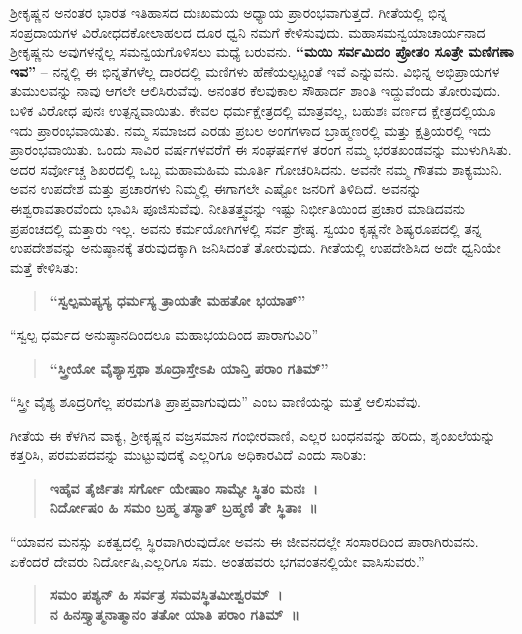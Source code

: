 ಶ‍್ರೀಕೃಷ್ಣನ ಅನಂತರ ಭಾರತ ಇತಿಹಾಸದ ದುಃಖಮಯ ಅಧ್ಯಾಯ ಪ್ರಾರಂಭವಾಗುತ್ತದೆ. ಗೀತೆಯಲ್ಲಿ ಭಿನ್ನ ಸಂಪ್ರದಾಯಗಳ ವಿರೋಧದ\break ಕೋಲಾಹಲದ ದೂರ ಧ್ವನಿ ನಮಗೆ ಕೇಳಿಸುವುದು. ಮಹಾಸಮನ್ವಯಾಚಾರ್ಯನಾದ ಶ‍್ರೀಕೃಷ್ಣನು ಅವುಗಳನ್ನೆಲ್ಲ ಸಮನ್ವಯಗೊಳಿಸಲು ಮಧ್ಯೆ ಬರುವನು. \textbf{“ಮಯಿ ಸರ್ವಮಿದಂ ಪ್ರೋತಂ ಸೂತ್ರೇ ಮಣಿಗಣಾ ಇವ”} – ನನ್ನಲ್ಲಿ ಈ ಭಿನ್ನತೆಗಳೆಲ್ಲ ದಾರದಲ್ಲಿ ಮಣಿಗಳು ಹೆಣೆಯಲ್ಪಟ್ಟಂತೆ ಇವೆ ಎನ್ನುವನು. ವಿಭಿನ್ನ ಅಭಿಪ್ರಾಯಗಳ ತುಮುಲವನ್ನು ನಾವು ಆಗಲೇ ಆಲಿಸಿರುವೆವು. ಅನಂತರ ಕೆಲವುಕಾಲ ಸೌಹಾರ್ದ ಶಾಂತಿ ಇದ್ದುವೆಂದು ತೋರುವುದು. ಬಳಿಕ ವಿರೋಧ ಪುನಃ ಉತ್ಪನ್ನವಾಯಿತು. ಕೇವಲ ಧರ್ಮಕ್ಷೇತ್ರದಲ್ಲಿ ಮಾತ್ರವಲ್ಲ, ಬಹುಶಃ ವರ್ಣದ ಕ್ಷೇತ್ರದಲ್ಲಿಯೂ ಇದು ಪ್ರಾರಂಭವಾಯಿತು. ನಮ್ಮ ಸಮಾಜದ ಎರಡು ಪ್ರಬಲ ಅಂಗಗಳಾದ ಬ್ರಾಹ್ಮಣರಲ್ಲಿ ಮತ್ತು ಕ್ಷತ್ರಿಯರಲ್ಲಿ ಇದು ಪ್ರಾರಂಭವಾಯಿತು. ಒಂದು ಸಾವಿರ ವರ್ಷಗಳವರೆಗೆ ಈ ಸಂಘರ್ಷಗಳ ತರಂಗ ನಮ್ಮ ಭರತಖಂಡವನ್ನು ಮುಳುಗಿಸಿತು. ಅದರ ಸರ್ವೋಚ್ಚ ಶಿಖರದಲ್ಲಿ ಒಬ್ಬ ಮಹಾಮಹಿಮ ಮೂರ್ತಿ ಗೋಚರಿಸಿದನು. ಅವನೇ ನಮ್ಮ ಗೌತಮ ಶಾಕ್ಯಮುನಿ. ಅವನ ಉಪದೇಶ ಮತ್ತು ಪ್ರಚಾರಗಳು ನಿಮ್ಮಲ್ಲಿ ಈಗಾಗಲೇ ಎಷ್ಟೋ ಜನರಿಗೆ ತಿಳಿದಿದೆ. ಅವನನ್ನು ಈಶ್ವರಾವತಾರವೆಂದು ಭಾವಿಸಿ ಪೂಜಿಸುವೆವು. ನೀತಿತತ್ತ್ವವನ್ನು ಇಷ್ಟು ನಿರ್ಭೀತಿಯಿಂದ ಪ್ರಚಾರ ಮಾಡಿದವನು ಪ್ರಪಂಚದಲ್ಲಿ ಮತ್ತಾರು ಇಲ್ಲ. ಅವನು ಕರ್ಮಯೋಗಿಗಳಲ್ಲಿ ಸರ್ವ ಶ್ರೇಷ್ಠ. ಸ್ವಯಂ ಕೃಷ್ಣನೇ ಶಿಷ್ಯರೂಪದಲ್ಲಿ ತನ್ನ ಉಪದೇಶವನ್ನು ಅನುಷ್ಠಾನಕ್ಕೆ ತರುವುದಕ್ಕಾಗಿ ಜನಿಸಿದಂತೆ ತೋರುವುದು. ಗೀತೆಯಲ್ಲಿ ಉಪದೇಶಿಸಿದ ಅದೇ ಧ್ವನಿಯೇ ಮತ್ತೆ ಕೇಳಿಸಿತು:

\begin{verse}
\textbf{“ಸ್ವಲ್ಪಮಪ್ಯಸ್ಯ ಧರ್ಮಸ್ಯ ತ್ರಾಯತೇ ಮಹತೋ ಭಯಾತ್​”}
\end{verse}

“ಸ್ವಲ್ಪ ಧರ್ಮದ ಅನುಷ್ಠಾನದಿಂದಲೂ ಮಹಾಭಯದಿಂದ ಪಾರಾಗುವಿರಿ”

\begin{verse}
\textbf{“ಸ್ತ್ರೀಯೋ ವೈಶ್ಯಾಸ್ತಥಾ ಶೂದ್ರಾಸ್ತೇಽಪಿ ಯಾನ್ತಿ ಪರಾಂ ಗತಿಮ್”​}
\end{verse}

“ಸ್ತ್ರೀ ವೈಶ್ಯ ಶೂದ್ರರಿಗೆಲ್ಲ ಪರಮಗತಿ ಪ್ರಾಪ್ತವಾಗುವುದು” ಎಂಬ ವಾಣಿಯನ್ನು ಮತ್ತೆ ಆಲಿಸುವೆವು.

ಗೀತೆಯ ಈ ಕೆಳಗಿನ ವಾಕ್ಯ, ಶ‍್ರೀಕೃಷ್ಣನ ವಜ್ರಸಮಾನ ಗಂಭೀರವಾಣಿ, ಎಲ್ಲರ ಬಂಧನವನ್ನು ಹರಿದು, ಶೃಂಖಲೆಯನ್ನು ಕತ್ತರಿಸಿ, ಪರಮಪದವನ್ನು ಮುಟ್ಟುವುದಕ್ಕೆ ಎಲ್ಲರಿಗೂ ಅಧಿಕಾರವಿದೆ ಎಂದು ಸಾರಿತು:

\begin{verse}
\textbf{ಇಹೈವ ತೈರ್ಜಿತಃ ಸರ್ಗೋ ಯೇಷಾಂ ಸಾಮ್ಯೇ ಸ್ಥಿತಂ ಮನಃ~।}\\\textbf{ನಿರ್ದೋಷಂ ಹಿ ಸಮಂ ಬ್ರಹ್ಮ ತಸ್ಮಾತ್​ ಬ್ರಹ್ಮಣಿ ತೇ ಸ್ಥಿತಾಃ~॥}
\end{verse}

“ಯಾವನ ಮನಸ್ಸು ಏಕತ್ವದಲ್ಲಿ ಸ್ಥಿರವಾಗಿರುವುದೋ ಅವನು ಈ ಜೀವನದಲ್ಲೇ ಸಂಸಾರದಿಂದ ಪಾರಾಗಿರುವನು. ಏಕೆಂದರೆ ದೇವರು ನಿರ್ದೋಷಿ,\break ಎಲ್ಲರಿಗೂ ಸಮ. ಅಂತಹವರು ಭಗವಂತನಲ್ಲಿಯೇ ವಾಸಿಸುವರು.”

\begin{verse}
\textbf{ಸಮಂ ಪಶ್ಯನ್​ ಹಿ ಸರ್ವತ್ರ ಸಮವಸ್ಥಿತಮೀಶ್ವರಮ್​~।}\\\textbf{ನ ಹಿನಸ್ತ್ಯಾತ್ಮನಾತ್ಮಾನಂ ತತೋ ಯಾತಿ ಪರಾಂ ಗತಿಮ್​~॥}
\end{verse}

